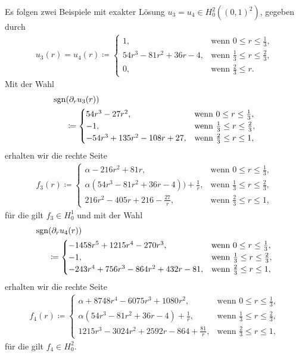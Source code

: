 Es folgen zwei Beispiele mit exakter Lösung $u_3=u_4 \in H^2_0((0,1)^2)$, 
gegeben durch 
\begin{align*}
  u_3(r)=u_4(r)\coloneqq 
  \begin{cases}
    1, & \text{wenn } 0\leq r\leq\frac{1}{3},\\
    54r^3 - 81r^2 + 36r - 4, & 
    \text{wenn } \frac{1}{3}\leq r\leq \frac{2}{3},\\
    0, & \text{wenn } \frac{2}{3}\leq r.
  \end{cases}
\end{align*}
Mit der Wahl
\begin{align*}
  \operatorname{sgn}&(\partial_r u_3(r)) \\
  &\coloneqq 
  \begin{cases}
    54r^3-27r^2, & \text{wenn } 0\leq r\leq\frac{1}{3},\\
    -1, & \text{wenn } \frac{1}{3}\leq r\leq \frac{2}{3},\\
    -54r^3 + 135r^2 - 108r + 27, & \text{wenn } \frac{2}{3}\leq r\leq 1,
  \end{cases}
\end{align*}
erhalten wir die rechte Seite
\begin{align*}
  f_3(r)\coloneqq 
  \begin{cases}
    \alpha - 216r^2 + 81r, &
    \text{wenn } 0\leq r\leq\frac{1}{3},\\
    \alpha\left(54r^3 - 81r^2 + 36r - 4\right)) + \frac{1}{r}, & 
    \text{wenn } \frac{1}{3}\leq r\leq \frac{2}{3},\\
    216r^2 - 405r + 216 - \frac{27}{r}, & 
    \text{wenn } \frac{2}{3}\leq r\leq 1,
  \end{cases}
\end{align*}
für die gilt $f_3\in H^1_0$
und mit der Wahl
\begin{align*}
  \operatorname{sgn}&(\partial_r u_4(r)) \\
  &\coloneqq 
  \begin{cases}
    -1458r^5 + 1215r^4 - 270r^3, & \text{wenn } 0\leq r\leq\frac{1}{3},\\
    -1, & \text{wenn } \frac{1}{3}\leq r\leq \frac{2}{3},\\
    -243r^4 + 756r^3 - 864r^2 + 432r - 81, 
    & \text{wenn } \frac{2}{3}\leq r\leq 1,
  \end{cases}
\end{align*}
erhalten wir die rechte Seite
\begin{align*}
  f_4(r)\coloneqq 
  \begin{cases}
    \alpha + 8748r^4 - 6075r^3 + 1080r^2, &
    \text{wenn } 0\leq r\leq\frac{1}{3},\\
    \alpha\left(54r^3 - 81r^2 + 36r - 4\right) + \frac{1}{r}, & 
    \text{wenn } \frac{1}{3}\leq r\leq \frac{2}{3},\\
    1215r^3 - 3024r^2 + 2592r - 864 + \frac{81}{r}, & 
    \text{wenn } \frac{2}{3}\leq r\leq 1,
  \end{cases}
\end{align*}
für die gilt $f_4\in H^2_0$.



